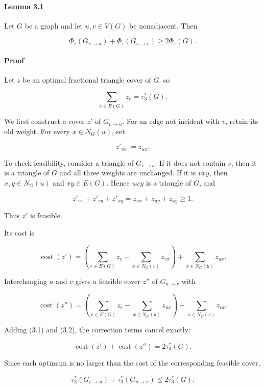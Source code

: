 \documentclass[english,11pt,a4paper]{article}
\begin{document}
\paragraph{Lemma 3.1}\label{lemma-3.1}

Let \(G\) be a graph and let \(u,v\in V(G)\) be nonadjacent. Then

\[
\boxed{
\Phi_\tau(G_{v\to u})
+
\Phi_\tau(G_{u\to v})
\ge
2\Phi_\tau(G)
}.
\]

\paragraph{Proof}\label{proof-1}

Let \(z\) be an optimal fractional triangle cover of \(G\), so

\[
\sum_{e\in E(G)}z_e=\tau_3^*(G).
\]

We first construct a cover \(z'\) of \(G_{v\to u}\). For an edge not
incident with \(v\), retain its old weight. For every \(x\in N_G(u)\),
set

\[
z'_{vx}:=z_{ux}.
\]

To check feasibility, consider a triangle of \(G_{v\to u}\). If it does
not contain \(v\), then it is a triangle of \(G\) and all three weights
are unchanged. If it is \(vxy\), then \(x,y\in N_G(u)\) and
\(xy\in E(G)\). Hence \(uxy\) is a triangle of \(G\), and

\[
z'_{vx}+z'_{vy}+z'_{xy}
=
z_{ux}+z_{uy}+z_{xy}
\ge1.
\]

Thus \(z'\) is feasible.

Its cost is

\[
\operatorname{cost}(z')
=
\left(
\sum_{e\in E(G)}z_e
-
\sum_{x\in N_G(v)}z_{vx}
\right)
+
\sum_{x\in N_G(u)}z_{ux}.
\tag{3.1}
\]

Interchanging \(u\) and \(v\) gives a feasible cover \(z''\) of
\(G_{u\to v}\) with

\[
\operatorname{cost}(z'')
=
\left(
\sum_{e\in E(G)}z_e
-
\sum_{x\in N_G(u)}z_{ux}
\right)
+
\sum_{x\in N_G(v)}z_{vx}.
\tag{3.2}
\]

Adding (3.1) and (3.2), the correction terms cancel exactly:

\[
\operatorname{cost}(z')
+
\operatorname{cost}(z'')
=
2\tau_3^*(G).
\]

Since each optimum is no larger than the cost of the corresponding
feasible cover,

\[
\tau_3^*(G_{v\to u})
+
\tau_3^*(G_{u\to v})
\le
2\tau_3^*(G).
\tag{3.3}
\]
\end{document}
